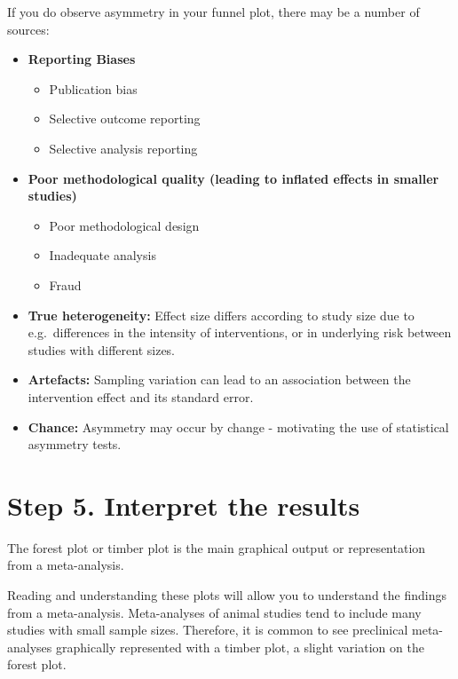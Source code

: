 \documentclass[
]{book}
\providecommand{\tightlist}{%
  \setlength{\itemsep}{0pt}\setlength{\parskip}{0pt}}
\begin{document}
If you do observe asymmetry in your funnel plot, there may be a number of sources:

\begin{itemize}
\item
  \textbf{Reporting Biases}

  \begin{itemize}
  \tightlist
  \item
    Publication bias
  \item
    Selective outcome reporting
  \item
    Selective analysis reporting
  \end{itemize}
\item
  \textbf{Poor methodological quality (leading to inflated effects in smaller studies)}

  \begin{itemize}
  \tightlist
  \item
    Poor methodological design
  \item
    Inadequate analysis
  \item
    Fraud
  \end{itemize}
\item
  \textbf{True heterogeneity:} Effect size differs according to study size due to e.g.~differences in the intensity of interventions, or in underlying risk between studies with different sizes.
\item
  \textbf{Artefacts:} Sampling variation can lead to an association between the intervention effect and its standard error.
\item
  \textbf{Chance:} Asymmetry may occur by change - motivating the use of statistical asymmetry tests.
\end{itemize}

\section{Step 5. Interpret the results}\label{step-5.-interpret-the-results}

The forest plot or timber plot is the main graphical output or representation from a meta-analysis.

Reading and understanding these plots will allow you to understand the findings from a meta-analysis. Meta-analyses of animal studies tend to include many studies with small sample sizes. Therefore, it is common to see preclinical meta-analyses graphically represented with a timber plot, a slight variation on the forest plot.
\end{document}
